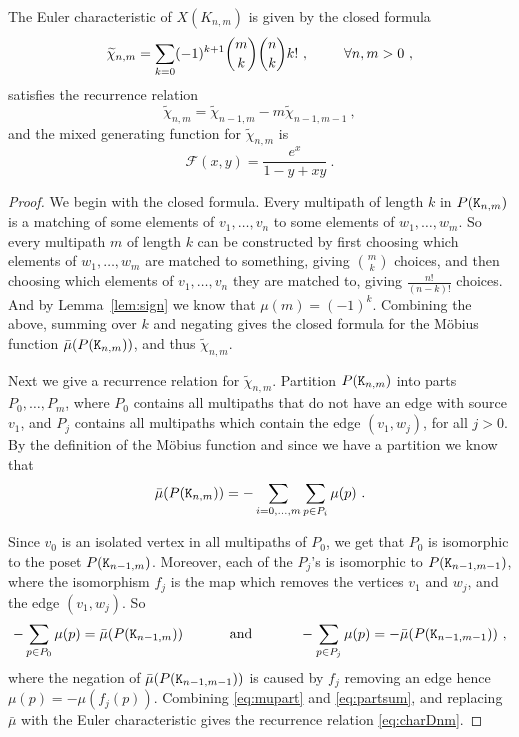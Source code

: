 \documentclass{amsart}
\begin{document}
\begin{thm}\label{thm:Knm}
The Euler characteristic of $X(K_{n,m})$ is given by the closed formula
\begin{equation}\label{eq:charDnmplain}
\widetilde{\chi}_{n,m}=\sum_{k=0}(-1)^{k+1}\dbinom{m}{k}\dbinom{n}{k}k!\ ,\hskip 25pt \forall n,m>0\ ,
\end{equation}
satisfies the recurrence relation
\begin{equation}\label{eq:charDnm}
 \widetilde{\chi}_{n,m}=\widetilde{\chi}_{n-1,m}-m \widetilde{\chi}_{n-1,m-1}\ ,
\end{equation}
and the mixed generating function for $\widetilde{\chi}_{n,m}$ is
$$\mathcal{F}(x,y)= \frac{e^x}{1-y+xy}\ .$$
\begin{proof}
We begin with the closed formula.
Every multipath of length $k$ in $P({\tt K}_{n,m})$ is a matching of some elements of $v_1,\dots,v_n$ to some elements of $w_1,\dots,w_m$. So every multipath $m$ of length $k$ can be constructed by first choosing which elements of $w_1,\dots,w_m$ are matched to something, giving $\binom{m}{k}$ choices, and then choosing which elements of $v_1,\dots,v_n$ they are matched to, giving $\frac{n!}{(n-k)!}$ choices. And by Lemma~\ref{lem:sign} we know that $\mu(m)=(-1)^k$. Combining the above, summing over $k$ and negating gives the closed formula for the M\"obius function $\bar{\mu}(P({\tt K}_{n,m}))$, and thus $\widetilde{\chi}_{n,m}$.

Next we give a recurrence relation for $\widetilde{\chi}_{n,m}$. Partition $P({\tt K}_{n,m})$ into parts $P_0,\ldots,P_m$, where $P_0$ contains all multipaths that do not have an edge with source $v_1$, and $P_j$ contains all multipaths which contain the edge $(v_1,w_j)$, for all $j>0$. By the definition of the M\"obius function and since we have a partition we know that \begin{equation}\label{eq:mupart}\bar{\mu}(P({\tt K}_{n,m}))=-\sum_{i=0,\ldots,m}\sum_{p\in P_i}\mu(p)\ .\end{equation}

Since $v_0$ is an isolated vertex in all multipaths of $P_0$, we get that $P_0$ is isomorphic to the poset $P({\tt K}_{n-1,m})$.  Moreover, each of the $P_j$'s is isomorphic to $P({\tt K}_{n-1,m-1})$, where the isomorphism $f_j$ is the map which removes the vertices $v_1$ and $w_j$, and the edge $(v_1,w_j)$. So 
\begin{equation}\label{eq:partsum}-\sum_{p\in P_0}\mu(p)=\bar{\mu}(P({\tt K}_{n-1,m}))\hskip 30pt\text{ and }\hskip 30pt-\sum_{p\in P_j}\mu(p)=-\bar{\mu}(P({\tt K}_{n-1,m-1}))\ ,\end{equation} where the negation of $\bar{\mu}(P({\tt K}_{n-1,m-1}))$ is caused by $f_j$ removing an edge hence $\mu(p)=-\mu(f_j(p))$.
Combining \eqref{eq:mupart} and \eqref{eq:partsum}, and replacing $\bar{\mu}$ with the Euler characteristic gives the recurrence relation \eqref{eq:charDnm}.


\end{proof}
\end{thm}
\end{document}
